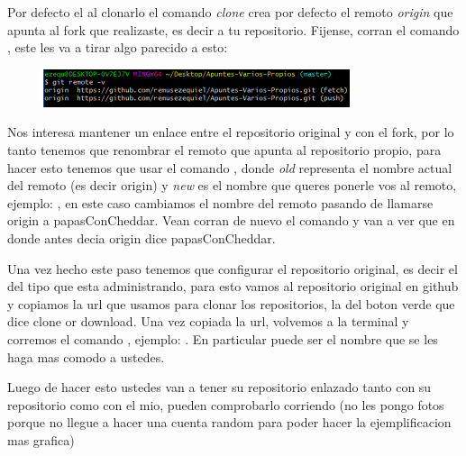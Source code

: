 \documentclass[10pt,journal,compsoc]{IEEEtran}
\begin{document}
Por defecto el al clonarlo el comando \textit{clone} crea por defecto el remoto \textit{origin} que apunta al fork que realizaste, es decir a tu repositorio. Fijense, corran el comando \textit{\color{Blue}{git remote -v}}, este les va a tirar algo parecido a esto:
\begin{figure}[H]
  \begin{center}
	 \includegraphics{figuras/gitRemote.png}
	 \centering
	 \renewcommand{\arraystretch}{1.3}
  \end{center}
\end{figure} 
Nos interesa mantener un enlace entre el repositorio original y con el fork, por lo tanto tenemos que renombrar el remoto que apunta al repositorio propio, para hacer esto tenemos que usar el comando \textit{\color{Blue}{git remote rename old new}}, donde \textit{old} representa el nombre actual del remoto (es decir origin) y \textit{new} es el nombre que queres ponerle vos al remoto, ejemplo: \textit{\color{Brown}{git remote rename origin papasConCheddar}}, en este caso cambiamos el nombre del remoto pasando de llamarse origin a papasConCheddar. Vean corran de nuevo el comando \textit{\color{Blue}{git remote -v}} y van a ver que en donde antes decia origin dice papasConCheddar.

Una vez hecho este paso tenemos que configurar el repositorio original, es decir el del tipo que esta administrando, para esto vamos al repositorio original en github y copiamos la url que usamos para clonar los repositorios, la del boton verde que dice clone or download. Una vez copiada la url, volvemos a la terminal y corremos el comando \textit{\color{Blue}{git remote add nombreQueVaATenerElRemoto url}}, ejemplo: \textit{}. En particular puede ser el nombre que se les haga mas comodo a ustedes.

 Luego de hacer esto ustedes van a tener su repositorio enlazado tanto con su repositorio como con el mio, pueden comprobarlo corriendo \textit{\color{Blue}{git remote -v}} (no les pongo fotos porque no llegue a hacer una cuenta random para poder hacer la ejemplificacion mas grafica)
\end{document}
